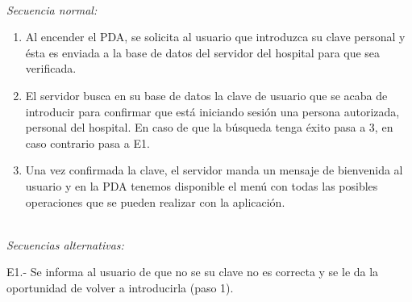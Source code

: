 \documentclass[12pt,a4paper,notitlepage,twoside]{report}
\begin{document}
\\
\emph{Secuencia normal:} 
\begin{enumerate}
\item Al encender el PDA, se solicita al usuario que introduzca su clave personal y \'esta es enviada a la base de datos del servidor del hospital para que sea verificada.
\item El servidor busca en su base de datos la clave de usuario que se acaba de introducir para confirmar que est\'a iniciando sesi\'on una persona autorizada, personal del hospital. En caso de que la b\'usqueda tenga \'exito pasa a 3, en caso contrario pasa a E1.
\item Una vez confirmada la clave, el servidor manda un mensaje de bienvenida al usuario y en la PDA tenemos disponible el men\'u con todas las posibles operaciones que se pueden realizar con la aplicaci\'on.
\end{enumerate}
\\
\emph{Secuencias alternativas:}
\begin{description}
\item E1.- Se informa al usuario de que no se su clave no es correcta y se le da la oportunidad de volver a introducirla (paso 1).
\end{description}
\\
\end{document}
